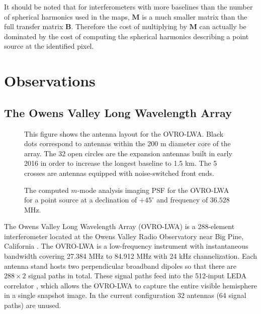 \documentclass[twocolumn]{aastex61}
\renewcommand{\b}{\pmb}
\begin{document}
It should be noted that for interferometers with more baselines than the number of spherical
harmonics used in the maps, $\b M$ is a much smaller matrix than the full transfer matrix $\b B$.
Therefore the cost of multiplying by $\b M$ can actually be dominated by the cost of computing the
spherical harmonics describing a point source at the identified pixel.


\section{Observations}

\subsection{The Owens Valley Long Wavelength Array}

\begin{figure}[ht]
    \caption{
        This figure shows the antenna layout for the OVRO-LWA. Black dots correspond to antennas
        within the 200 m diameter core of the array. The 32 open circles are the expansion antennas
        built in early 2016 in order to increase the longest baseline to 1.5 km. The 5 crosses are
        antennas equipped with noise-switched front ends.
    }
    \label{fig:antenna-layout}
\end{figure}

\begin{figure}[ht]
    \caption{
        The computed $m$-mode analysis imaging PSF for the OVRO-LWA for a point source at a
        declination of $+45^\circ$ and frequency of $36.528$ MHz.
    }
    \label{fig:psf}
\end{figure}

The Owens Valley Long Wavelength Array (OVRO-LWA) is a 288-element interferometer located at the
Owens Valley Radio Observatory near Big Pine, California \citep{todo_hallinan_2017}.  The OVRO-LWA
is a low-frequency instrument with instantaneous bandwidth covering 27.384 MHz to 84.912 MHz with 24
kHz channelization.  Each antenna stand hosts two perpendicular broadband dipoles so that there are
$288\times2$ signal paths in total. These signal paths feed into the 512-input LEDA correlator
\citep{2015JAI.....450003K}, which allows the OVRO-LWA to capture the entire visible hemisphere in a
single snapshot image.  In the current configuration 32 antennas (64 signal paths) are unused.
\end{document}
